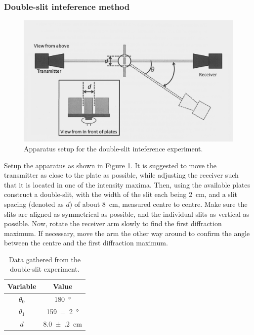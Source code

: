 \documentclass[letter,12pt]{article}
\numberwithin{equation}{section}
\numberwithin{figure}{section}
\numberwithin{table}{section}
\begin{document}
\subsubsection{Double-slit inteference method}
\begin{figure}
  \centering
  \includegraphics[width=\textwidth]{Double-slit.png}
  \caption{Apparatus setup for the double-slit inteference experiment.}
  \label{fig:e1}
\end{figure}
Setup the apparatus as shown in Figure \ref{fig:e1}. It is suggested to move the transmitter as close to the plate as possible, while adjusting the receiver such that it is located in one of the intensity maxima. Then, using the available plates construct a double-slit, with the width of the slit each being \SI{2}{\cm}, and a slit spacing (denoted as \(d\)) of about \SI{8}{\cm}, measured centre to centre. Make sure the slits are aligned as symmetrical as possible, and the individual slits as vertical as possible. Now, rotate the receiver arm slowly to find the first diffraction maximum. If necessary, move the arm the other way around to confirm the angle between the centre and the first diffraction maximum.

\begin{table}[!ht]
  \centering
  \begin{tabular}{cS}
    \toprule
    {Variable} & {Value} \\ \midrule
    \(\theta_0\) & \SI{180}{\degree} \\
    \(\theta_1\) & \SI{159(2)}{\degree} \\
    \(d\) & \SI{8.0(2)}{\cm} \\
    \bottomrule
  \end{tabular}
  \caption{Data gathered from the double-slit experiment.}
  \label{table:e2}
\end{table}
\end{document}

